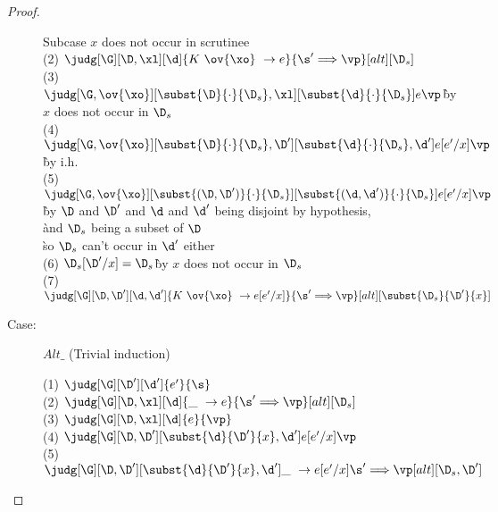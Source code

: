 \begin{proof}
\begin{description}
\begin{tabbing}
  Subcase $x$ does not occur in scrutinee\\
    (2) $\judg[\G][\D,\xl][\d]{K~\ov{\xo}~\to e}{\s' \Longrightarrow \vp}[alt][\D_s]$\\
    (3) $\judg[\G,\ov{\xo}][\subst{\D}{\cdot}{\D_s},\xl][\subst{\d}{\cdot}{\D_s}]{e}{\vp}$\`by $x$ does not occur in $\D_s$\\
    (4) $\judg[\G,\ov{\xo}][\subst{\D}{\cdot}{\D_s},\D'][\subst{\d}{\cdot}{\D_s},\d']{e[e'/x]}{\vp}$\`by i.h.\\
    (5) $\judg[\G,\ov{\xo}][\subst{(\D,\D')}{\cdot}{\D_s}][\subst{(\d,\d')}{\cdot}{\D_s}]{e[e'/x]}{\vp}$\\
    \`by $\D$ and $\D'$ and $\d$ and $\d'$ being disjoint by hypothesis,\\
    \`and $\D_s$ being a subset of $\D$\\ %
    \`so $\D_s$ can't occur in $\d'$ either\\
    (6) $\D_s[\D'/x] = \D_s$\`by $x$ does not occur in $\D_s$\\
    (7) $\judg[\G][\D,\D'][\d,\d']{K~\ov{\xo}~\to e[e'/x]}{\s' \Longrightarrow \vp}[alt][\subst{\D_s}{\D'}{x}]$\\
\end{tabbing}

\item[Case:] $Alt\_$ (Trivial induction)
\begin{tabbing}
    (1) $\judg[\G][\D'][\d']{e'}{\s}$\\
    (2) $\judg[\G][\D,\xl][\d]{\_~\to e}{\s' \Longrightarrow \vp}[alt][\D_s]$\\
    (3) $\judg[\G][\D,\xl][\d]{e}{\vp}$\\
    (4) $\judg[\G][\D,\D'][\subst{\d}{\D'}{x},\d']{e[e'/x]}{\vp}$\\
    (5) $\judg[\G][\D,\D'][\subst{\d}{\D'}{x},\d']{\_~\to e[e'/x]}{\s' \Longrightarrow \vp}[alt][\D_s,\D']$\\
\end{tabbing}

\end{description}

\end{proof}

